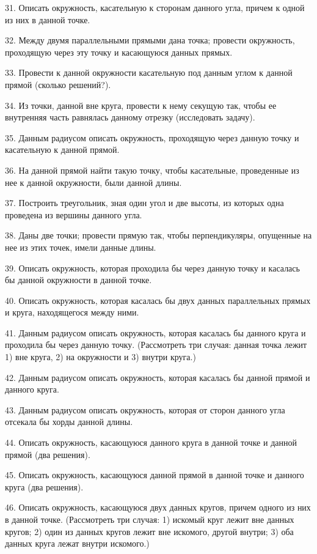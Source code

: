 \documentclass[oneside]{book}
\begin{document}
31.
Описать окружность, касательную к сторонам данного угла, причем к одной из них в данной точке.

32.
Между двумя параллельными прямыми дана точка;
провести окружность, проходящую через эту точку и касающуюся данных прямых.

33.
Провести к данной окружности касательную под данным углом к данной прямой (сколько решений?).

34.
Из точки, данной вне круга, провести к нему секущую так, чтобы ее внутренняя часть равнялась данному отрезку (исследовать задачу).

35.
Данным радиусом описать окружность, проходящую через данную точку и касательную к данной прямой.

36.
На данной прямой найти такую точку, чтобы касательные, проведенные из нее к данной окружности, были данной длины.

37.
Построить треугольник, зная один угол и две высоты, из которых одна проведена из вершины данного угла.

38.
Даны две точки;
провести прямую так, чтобы перпендикуляры, опущенные на нее из этих точек, имели данные длины.

39.
Описать окружность, которая проходила бы через данную точку и касалась бы данной окружности в данной точке.

40.
Описать окружность, которая касалась бы двух данных параллельных прямых и круга, находящегося между ними.

41.
Данным радиусом описать окружность, которая касалась бы данного круга и проходила бы через данную точку.
(Рассмотреть три случая:
данная точка лежит 
1) вне круга, 
2) на окружности 
и 3) внутри круга.)

42.
Данным радиусом описать окружность, которая касалась бы данной прямой и данного круга.

43.
Данным радиусом описать окружность, которая от сторон данного угла отсекала бы хорды данной длины.

44.
Описать окружность, касающуюся данного круга в данной точке и данной прямой (два решения).

45.
Описать окружность, касающуюся данной прямой в данной точке и данного круга (два решения).

46.
Описать окружность, касающуюся двух данных кругов, причем одного из них в данной точке.
(Рассмотреть три случая:
1) искомый круг лежит вне данных кругов;
2) один из данных кругов лежит вне искомого, другой внутри;
3) оба данных круга лежат внутри искомого.)
\end{document}
